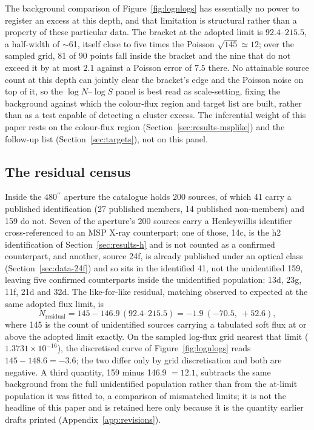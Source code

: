 \documentclass[11pt]{article}
\newcommand{\as}{\ensuremath{^{\prime\prime}}}
\begin{document}
The background comparison of Figure~\ref{fig:lognlogs} has essentially no power to register an excess at this depth, and that limitation is structural rather than a property of these particular data. The bracket at the adopted limit is $92.4$--$215.5$, a half-width of $\sim$61, itself close to five times the Poisson $\sqrt{145}\simeq12$; over the sampled grid, 81 of 90 points fall inside the bracket and the nine that do not exceed it by at most $2.1$ against a Poisson error of $7.5$ there. No attainable source count at this depth can jointly clear the bracket's edge and the Poisson noise on top of it, so the $\log N$--$\log S$ panel is best read as scale-setting, fixing the background against which the colour-flux region and target list are built, rather than as a test capable of detecting a cluster excess. The inferential weight of this paper rests on the colour-flux region (Section~\ref{sec:results-msplike}) and the follow-up list (Section~\ref{sec:targets}), not on this panel.

\subsection{The residual census}
\label{sec:results-residual}

Inside the $480\as$ aperture the catalogue holds 200 sources, of which 41 carry a published identification (27 published members, 14 published non-members) and 159 do not. Seven of the aperture's 200 sources carry a Henleywillis identifier cross-referenced to an MSP X-ray counterpart; one of those, 14c, is the h2 identification of Section~\ref{sec:results-h} and is not counted as a confirmed counterpart, and another, source 24f, is already published under an optical class (Section~\ref{sec:data-24f}) and so sits in the identified 41, not the unidentified 159, leaving five confirmed counterparts inside the unidentified population: 13d, 23g, 11f, 21d and 32d. The like-for-like residual, matching observed to expected at the same adopted flux limit, is
\begin{equation}
N_{\mathrm{residual}} = 145 - 146.9\,(92.4\text{--}215.5) = -1.9\ (-70.5,\ +52.6),
\label{eq:residual}
\end{equation}
where 145 is the count of unidentified sources carrying a tabulated soft flux at or above the adopted limit exactly. On the sampled log-flux grid nearest that limit ($1.3731\times10^{-16}$), the discretised curve of Figure~\ref{fig:lognlogs} reads $145 - 148.6 = -3.6$; the two differ only by grid discretisation and both are negative. A third quantity, 159 minus 146.9 $= 12.1$, subtracts the same background from the full unidentified population rather than from the at-limit population it was fitted to, a comparison of mismatched limits; it is not the headline of this paper and is retained here only because it is the quantity earlier drafts printed (Appendix~\ref{app:revisions}).
\end{document}

